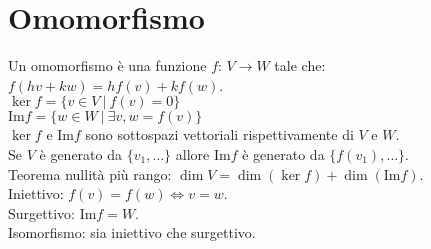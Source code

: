 \section{Omomorfismo}
Un omomorfismo è una funzione $f\text{: } V \rightarrow W$ tale che:
$f(hv+kw)=hf(v)+kf(w)$. \\
$\ker f = \{ v \in V \ | \ f(v)=0 \}$ \\
$\text{Im} f = \{ w \in W \ | \ \exists v, w=f(v) \}$ \\
$\ker f$ e $\text{Im} f$ sono sottospazi vettoriali rispettivamente di $V$ e $W$. \\
Se $V$ è generato da $\{ v_1, \ldots \}$ allore $\text{Im} f$ è generato da $\{ f(v_1), \ldots \}$. \\
Teorema nullità più rango: $\dim V = \dim (\ker f) + \dim (\text{Im}f)$. \\
Iniettivo: $f(v)=f(w) \Leftrightarrow v=w$. \\
Surgettivo: $\text{Im} f = W$. \\
Isomorfismo: sia iniettivo che surgettivo. \\
